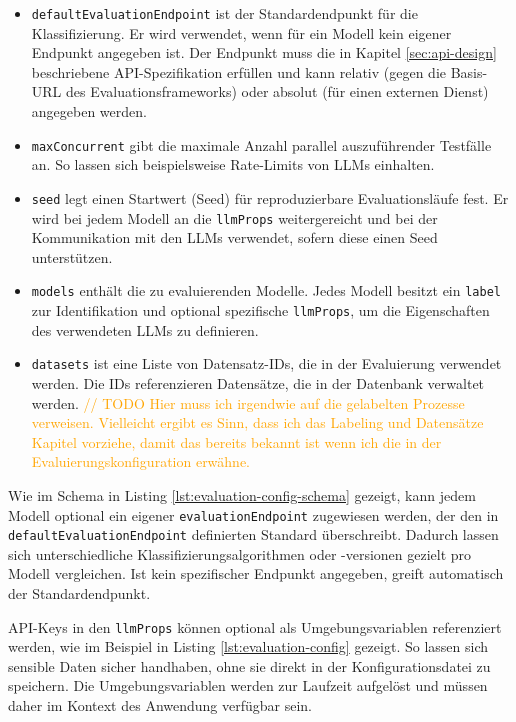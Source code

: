 \begin{itemize}
    \item \texttt{defaultEvaluationEndpoint} ist der Standardendpunkt für die Klassifizierung. Er wird verwendet, wenn für ein Modell kein eigener Endpunkt angegeben ist. Der Endpunkt muss die in Kapitel \ref{sec:api-design} beschriebene API-Spezifikation erfüllen und kann relativ (gegen die Basis-URL des Evaluationsframeworks) oder absolut (für einen externen Dienst) angegeben werden.
    \item \texttt{maxConcurrent} gibt die maximale Anzahl parallel auszuführender Testfälle an. So lassen sich beispielsweise Rate-Limits von \acp{LLM} einhalten.
    \item \texttt{seed} legt einen Startwert (Seed) für reproduzierbare Evaluationsläufe fest. Er wird bei jedem Modell an die \texttt{llmProps} weitergereicht und bei der Kommunikation mit den \acp{LLM} verwendet, sofern diese einen Seed unterstützen.
    \item \texttt{models} enthält die zu evaluierenden Modelle. Jedes Modell besitzt ein \texttt{label} zur Identifikation und optional spezifische \texttt{llmProps}, um die Eigenschaften des verwendeten \acp{LLM} zu definieren.
    \item \texttt{datasets} ist eine Liste von Datensatz-IDs, die in der Evaluierung verwendet werden. Die IDs referenzieren Datensätze, die in der Datenbank verwaltet werden. \textcolor{orange}{// TODO Hier muss ich irgendwie auf die gelabelten Prozesse verweisen. Vielleicht ergibt es Sinn, dass ich das Labeling und Datensätze Kapitel vorziehe, damit das bereits bekannt ist wenn ich die in der Evaluierungskonfiguration erwähne.}
\end{itemize}

Wie im Schema in Listing \ref{lst:evaluation-config-schema} gezeigt, kann jedem Modell optional ein eigener \texttt{evaluationEndpoint} zugewiesen werden, der den in \texttt{defaultEvaluationEndpoint} definierten Standard überschreibt. Dadurch lassen sich unterschiedliche Klassifizierungsalgorithmen oder -versionen gezielt pro Modell vergleichen. Ist kein spezifischer Endpunkt angegeben, greift automatisch der Standardendpunkt.

API-Keys in den \texttt{llmProps} können optional als Umgebungsvariablen referenziert werden, wie im Beispiel in Listing \ref{lst:evaluation-config} gezeigt. So lassen sich sensible Daten sicher handhaben, ohne sie direkt in der Konfigurationsdatei zu speichern. Die Umgebungsvariablen werden zur Laufzeit aufgelöst und müssen daher im Kontext des Anwendung verfügbar sein.
